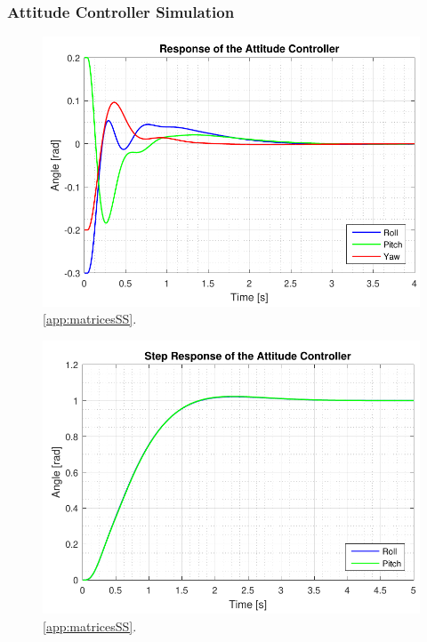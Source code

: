 \subsubsection{Attitude Controller Simulation}

\begin{figure}[H]
	\centering
	\includegraphics[scale=0.8]{figures/ssFinalEq.pdf}
	\caption{ \autoref{app:matricesSS}.}
	\label{fig:TranslationalControlDiagram}
\end{figure}


\begin{figure}[H]
	\centering
	\includegraphics[scale=0.8]{figures/ssFinalStep.pdf}
	\caption{\autoref{app:matricesSS}.}
	\label{fig:TranslationalControlDiagram}
\end{figure}

